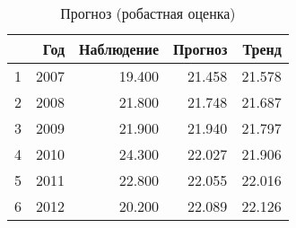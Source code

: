 \begin{table}[ht]
\centering
\begin{tabular}{rrrrr}
  \hline
 & Год & Наблюдение & Прогноз & Тренд \\ 
  \hline
1 & 2007 & 19.400 & 21.458 & 21.578 \\ 
  2 & 2008 & 21.800 & 21.748 & 21.687 \\ 
  3 & 2009 & 21.900 & 21.940 & 21.797 \\ 
  4 & 2010 & 24.300 & 22.027 & 21.906 \\ 
  5 & 2011 & 22.800 & 22.055 & 22.016 \\ 
  6 & 2012 & 20.200 & 22.089 & 22.126 \\ 
   \hline
\end{tabular}
\caption{Прогноз (робастная оценка)} 
\label{table:robust-prediction}
\end{table}
